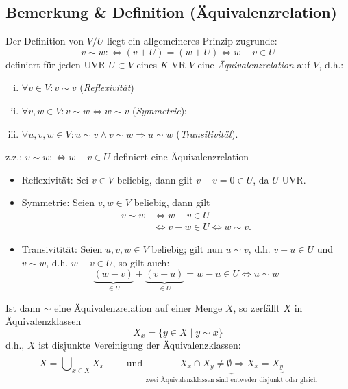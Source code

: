  \subsection{Bemerkung \& Definition (Äquivalenzrelation)}
 	\begin{Definition}[Äquivalenzrelation]
 		Der Definition von $ V/U $ liegt ein allgemeineres Prinzip zugrunde:
 		\[
 			v\sim w :\Leftrightarrow (v+U)= (w+U) \Leftrightarrow w-v \in U
 		\]
 		definiert für jeden UVR $ U\subset V $ eines $ K $-VR $ V $ eine \emph{Äquivalenzrelation} auf $ V $, d.h.:
 		\begin{enumerate}[(i)]
 			\item $ \forall v\in V: v\sim v $ (\emph{Reflexivität})
 			\item $ \forall v,w\in V: v\sim w\Leftrightarrow w\sim v $ (\emph{Symmetrie});
 			\item $ \forall u,v,w\in V: u\sim v\land v\sim w\Rightarrow u\sim w $ (\emph{Transitivität}).
 		\end{enumerate}
 	\end{Definition}

 	z.z.: $ v\sim w:\Leftrightarrow w-v\in U $ definiert eine Äquivalenzrelation

 	\begin{itemize}
 		\item Reflexivität: Sei $ v\in V $ beliebig, dann gilt $ v-v=0\in U $, da $ U $ UVR.
 		\item Symmetrie: Seien $ v,w\in V $ beliebig, dann gilt
 		      \begin{align*}
 		      	v\sim w & \Leftrightarrow w-v\in U                          \\
 		      	        & \Leftrightarrow v-w\in U \Leftrightarrow w\sim v.
 		      \end{align*}
 		\item Transivitität: Seien $ u,v,w\in V $ beliebig; gilt nun
 		      $u\sim v$, d.h. $v-u\in U$ und $v\sim w$, d.h. $w-v\in U$, so gilt auch:
 		      \[
 		      	\underbrace{(w-v)}_{\in U}+\underbrace{(v-u)}_{\in U}= w-u\in U \Leftrightarrow u\sim w
 		      \]
 	\end{itemize}

 	Ist dann $ \sim $ eine Äquivalenzrelation auf einer Menge $ X $, so zerfällt $ X $ in Äquivalenzklassen
 	\[
 		X_x = \{y\in X\mid y\sim x\}
 	\]
 	d.h., $ X $ ist disjunkte Vereinigung der Äquivalenzklassen:
 	\[
 		X = \dot{\bigcup}_{x\in X}X_x \qquad\text{ und } \underbrace{X_x \cap X_y \neq \emptyset \Rightarrow X_x = X_y}_{\text{zwei Äquivalenzklassen sind entweder disjunkt oder gleich}}
 	\]

